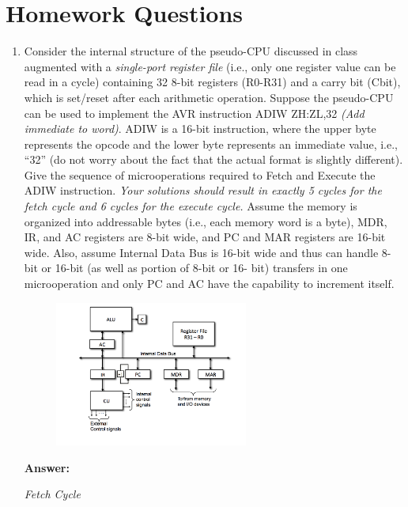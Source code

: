 \documentclass[12pt,letterpaper]{article}
\begin{document}
\section{Homework Questions}
\begin{enumerate}
    \item
    Consider the internal structure of the pseudo-CPU discussed in class augmented with a \textit{single-port register file} (i.e., only one register value can be read in a cycle) containing 32 8-bit registers (R0-R31) and a carry bit (Cbit), which is set/reset after each arithmetic operation. 
    Suppose the pseudo-CPU can be used to implement the AVR instruction ADIW ZH:ZL,32 \textit{(Add immediate to word)}. ADIW is a 16-bit instruction, where the upper byte represents the opcode and the lower byte represents an immediate value, i.e., “32” (do not worry about the fact that the actual format is slightly different). 
    Give the sequence of microoperations required to Fetch and Execute the ADIW instruction. 
   \textit{ Your solutions should result in exactly 5 cycles for the fetch cycle and 6 cycles for the execute cycle.} 
    Assume the memory is organized into addressable bytes (i.e., each memory word is a byte), MDR, IR, and AC registers are 8-bit wide, and PC and MAR registers are 16-bit wide. Also, assume Internal Data Bus is 16-bit wide and thus can handle 8-bit or 16-bit (as well as portion of 8-bit or 16-
    bit) transfers in one microoperation and only PC and AC have the capability to increment itself.
   
   	\begin{figure}[h]
   		\centering
   		\includegraphics[width=0.6\textwidth]{Q1.png}
   \end{figure}
   
   
   
   \textbf{Answer:}
   
	\begin{center}
		\textit{Fetch Cycle}
	\end{center}


\end{enumerate}
\end{document}
